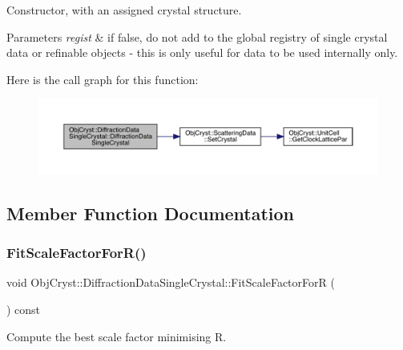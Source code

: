 Constructor, with an assigned crystal structure.


\begin{DoxyParams}{Parameters}
{\em regist} & if false, do not add to the global registry of single crystal data or refinable objects -\/ this is only useful for data to be used internally only. \\
\hline
\end{DoxyParams}
Here is the call graph for this function\+:
\nopagebreak
\begin{figure}[H]
\begin{center}
\leavevmode
\includegraphics[width=350pt]{class_obj_cryst_1_1_diffraction_data_single_crystal_a3fcfa9d8f263043025d4167001c2243f_cgraph}
\end{center}
\end{figure}


\subsection{Member Function Documentation}
\mbox{\label{class_obj_cryst_1_1_diffraction_data_single_crystal_a64a07606d4f21cc2d6389161bebc8645}} 
\subsubsection{\texorpdfstring{FitScaleFactorForR()}{FitScaleFactorForR()}}
{\footnotesize\ttfamily void Obj\+Cryst\+::\+Diffraction\+Data\+Single\+Crystal\+::\+Fit\+Scale\+Factor\+ForR (\begin{DoxyParamCaption}{ }\end{DoxyParamCaption}) const\hspace{0.3cm}{\ttfamily [virtual]}}

Compute the best scale factor minimising R.

